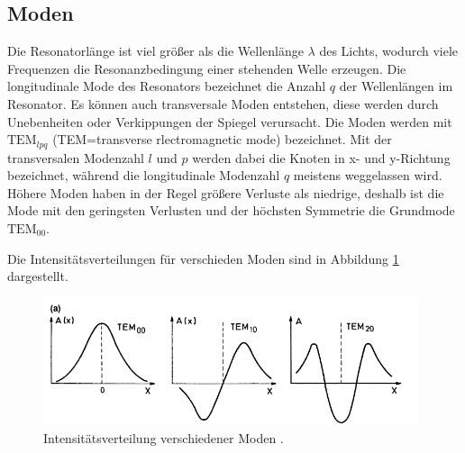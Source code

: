 \subsection{Moden}
Die Resonatorlänge ist viel größer als die Wellenlänge $\lambda$ des Lichts, wodurch viele Frequenzen die
Resonanzbedingung einer stehenden Welle erzeugen.
Die longitudinale Mode des Resonators bezeichnet die Anzahl $q$ der Wellenlängen im Resonator. Es können
auch transversale Moden entstehen, diese werden durch Unebenheiten oder Verkippungen der Spiegel verursacht.
Die Moden werden mit $\text{TEM}_{lpq}$ (TEM=transverse rlectromagnetic mode) bezeichnet. Mit der
transversalen Modenzahl $l$ und $p$ werden dabei die Knoten in x- und y-Richtung bezeichnet,
während die longitudinale Modenzahl $q$ meistens weggelassen wird.
Höhere Moden haben in der Regel größere Verluste als niedrige, deshalb ist die Mode mit den geringsten
Verlusten und der höchsten Symmetrie die Grundmode $\text{TEM}_{00}$.

Die Intensitätsverteilungen für verschieden Moden sind in Abbildung \ref{fig:TEM} dargestellt.
\begin{figure}[H]
  \centering
  \includegraphics[width=11cm]{TEM.png}
  \caption{Intensitätsverteilung verschiedener Moden \cite{springer}.}
  \label{fig:TEM}
\end{figure}

